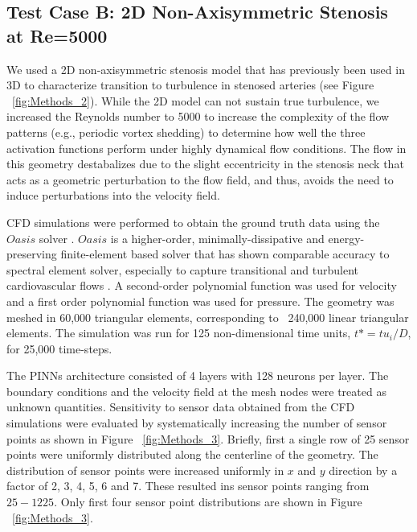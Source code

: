 \documentclass[times,twocolumn,final]{elsarticle}
\begin{document}
{\subsection{Test Case B: 2D Non-Axisymmetric Stenosis at Re=5000}
We used a 2D non-axisymmetric stenosis model that has previously been used in 3D to characterize transition to turbulence in stenosed arteries \citep{Varghese2007_DNS} (see Figure ~\ref{fig:Methods_2}). While the 2D model can not sustain true turbulence, we  increased the Reynolds number to 5000 to increase the complexity of the flow patterns (e.g., periodic vortex shedding) to determine how well the three activation functions perform under highly dynamical flow conditions. The flow in this geometry destabalizes due to the slight eccentricity in the stenosis neck that acts as a geometric perturbation to the flow field, and thus, avoids the need to induce perturbations into the velocity field.  

CFD simulations were performed to obtain the ground truth data using the $Oasis$ solver \citep{Mortensen2015_CFD}. $Oasis$ is a higher-order, minimally-dissipative and energy-preserving finite-element based solver that has shown comparable accuracy to spectral element solver, especially to capture transitional and turbulent cardiovascular flows \citep{Khan2019_DNS}. A second-order polynomial function was used for velocity and a first order polynomial function was used for pressure. The geometry was meshed in 60,000 triangular elements, corresponding to ~240,000 linear triangular elements. The simulation was run for 125 non-dimensional time units, $t*=tu_i/D$, for 25,000 time-steps.

The PINNs architecture consisted of 4 layers with 128 neurons per layer. The boundary conditions and the velocity field at the mesh nodes were treated as unknown quantities. Sensitivity to sensor data obtained from the CFD simulations were evaluated by systematically increasing the number of sensor points as shown in Figure ~\ref{fig:Methods_3}. Briefly, first a single row of 25 sensor points were uniformly distributed along the centerline of the geometry. The distribution of sensor points were increased uniformly in $x$ and $y$ direction by a factor of 2, 3, 4, 5, 6 and 7. These resulted ins sensor points ranging from $25 - 1225$. Only first four sensor point distributions are shown in Figure ~\ref{fig:Methods_3}. 

}
\end{document}
